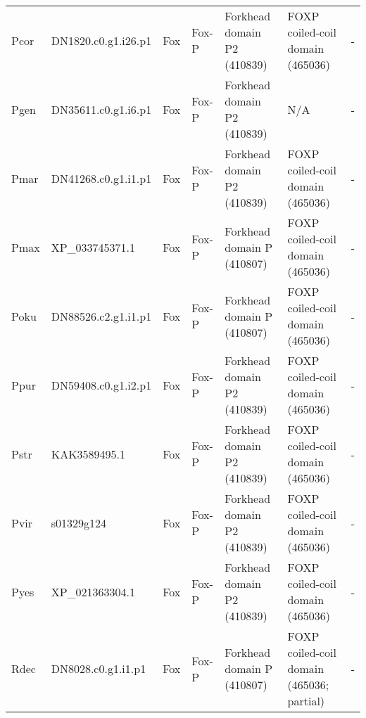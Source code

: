 \documentclass[../main.tex]{subfiles}
\begin{document}
\begin{landscape}
\begin{longtable}{lllllll}
		Pcor           & DN1820.c0.g1.i26.p1   & Fox            & Fox-P               & Forkhead domain P2 (410839)                 & FOXP coiled-coil domain (465036)                                       & -                    \\
		Pgen           & DN35611.c0.g1.i6.p1   & Fox            & Fox-P               & Forkhead domain P2 (410839)                 & N/A                                                                    & -                    \\
		Pmar           & DN41268.c0.g1.i1.p1   & Fox            & Fox-P               & Forkhead domain P2 (410839)                 & FOXP coiled-coil domain (465036)                                       & -                    \\
		Pmax           & XP\_033745371.1       & Fox            & Fox-P               & Forkhead domain P (410807)                  & FOXP coiled-coil domain (465036)                                       & -                    \\
		Poku           & DN88526.c2.g1.i1.p1   & Fox            & Fox-P               & Forkhead domain P (410807)                  & FOXP coiled-coil domain (465036)                                       & -                    \\
		Ppur           & DN59408.c0.g1.i2.p1   & Fox            & Fox-P               & Forkhead domain P2 (410839)                 & FOXP coiled-coil domain (465036)                                       & -                    \\
		Pstr           & KAK3589495.1          & Fox            & Fox-P               & Forkhead domain P2 (410839)                 & FOXP coiled-coil domain (465036)                                       & -                    \\
		Pvir           & s01329g124            & Fox            & Fox-P               & Forkhead domain P2 (410839)                 & FOXP coiled-coil domain (465036)                                       & -                    \\
		Pyes           & XP\_021363304.1       & Fox            & Fox-P               & Forkhead domain P2 (410839)                 & FOXP coiled-coil domain (465036)                                       & -                    \\
		Rdec           & DN8028.c0.g1.i1.p1    & Fox            & Fox-P               & Forkhead domain P (410807)                  & FOXP coiled-coil domain (465036; partial)                              & -                    \\

\end{longtable}
\end{landscape}
\end{document}
